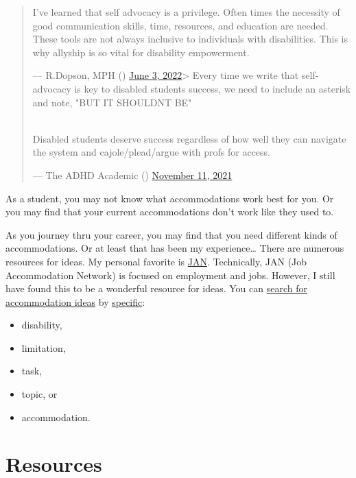 \begin{quote}
I've learned that self advocacy is a privilege. Often times the
necessity of good communication skills, time, resources, and education
are needed. These tools are not always inclusive to individuals with
disabilities. This is why allyship is so vital for disability
empowerment.

--- R.Dopson, MPH (\citet{Rasheeradiara}) \href{https://twitter.com/Rasheeradiara/status/1532760383500472326}{June 3,
2022}\textgreater{} Every time we write that self-advocacy is key to disabled students\textquotesingle{}
success, we need to include an asterisk and note, "BUT IT SHOULDN\textquotesingle T
BE"\\
\strut \\
Disabled students deserve success regardless of how well they can
navigate the system and cajole/plead/argue with profs for access.

\begin{flushright}--- The ADHD Academic (\citet{theADHDacademic}) \href{https://twitter.com/theADHDacademic/status/1458876178580881410}{November 11,
2021}\end{flushright}
\end{quote}

As a student, you may not know what accommodations work best for you. Or you may find that your current accommodations don't work like they used to.

As you journey thru your career, you may find that you need different kinds of accommodations. Or at least that has been my experience\ldots{} There are numerous resources for ideas.
My personal favorite is \href{https://askjan.org/}{JAN}. Technically, JAN (Job Accommodation Network) is focused on employment and jobs.
However, I still have found this to be a wonderful resource for ideas.
You can \href{https://askjan.org/soar.cfm}{search for accommodation ideas} by \href{https://askjan.org/a-to-z.cfm}{specific}:

\begin{itemize}
\tightlist
\item
  disability,
\item
  limitation,
\item
  task,
\item
  topic, or
\item
  accommodation.
\end{itemize}

\hypertarget{resources}{%
\section{Resources}\label{resources}}

